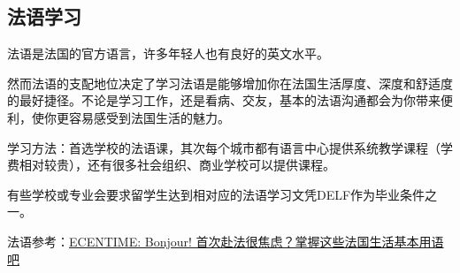 \subsection{法语学习}

法语是法国的官方语言，许多年轻人也有良好的英文水平。

然而法语的支配地位决定了学习法语是能够增加你在法国生活厚度、深度和舒适度的最好捷径。不论是学习工作，还是看病、交友，基本的法语沟通都会为你带来便利，使你更容易感受到法国生活的魅力。

学习方法：首选学校的法语课，其次每个城市都有语言中心提供系统教学课程（学费相对较贵），还有很多社会组织、商业学校可以提供课程。

有些学校或专业会要求留学生达到相对应的法语学习文凭DELF作为毕业条件之一。

法语参考：\href{https://www.ecentime.com/article/francais-quotidien-}{ECENTIME: Bonjour! 首次赴法很焦虑？掌握这些法国生活基本用语吧 }
